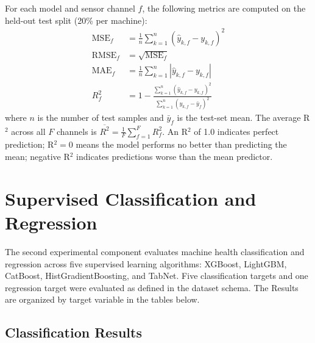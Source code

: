For each model and sensor channel $f$, the following metrics are computed on the held-out test split (20\% per machine):
\begin{align}
    \text{MSE}_f &= \frac{1}{n}\sum_{k=1}^{n}(\hat{y}_{k,f} - y_{k,f})^2
    \label{eq:mse} \\[4pt]
    \text{RMSE}_f &= \sqrt{\text{MSE}_f}
    \label{eq:rmse} \\[4pt]
    \text{MAE}_f &= \frac{1}{n}\sum_{k=1}^{n}|\hat{y}_{k,f} - y_{k,f}|
    \label{eq:mae} \\[4pt]
    R^2_f &= 1 - \frac{\sum_{k=1}^{n}(\hat{y}_{k,f} - y_{k,f})^2}{\sum_{k=1}^{n}(y_{k,f} - \bar{y}_f)^2}
    \label{eq:r2}
\end{align}
where $n$ is the number of test samples and $\bar{y}_f$ is the test-set mean. The average R$^2$ across all $F$ channels is $\overline{R^2} = \frac{1}{F}\sum_{f=1}^{F} R^2_f$. An R$^2$ of 1.0 indicates perfect prediction; R$^2 = 0$ means the model performs no better than predicting the mean; negative R$^2$ indicates predictions worse than the mean predictor.


\section{Supervised Classification and Regression}

The second experimental component evaluates machine health classification and regression across five supervised learning algorithms: XGBoost, LightGBM, CatBoost, HistGradientBoosting, and TabNet. Five classification targets and one regression target were evaluated as defined in the dataset schema. The Results are organized by target variable in the tables below.

\subsection{Classification Results}

